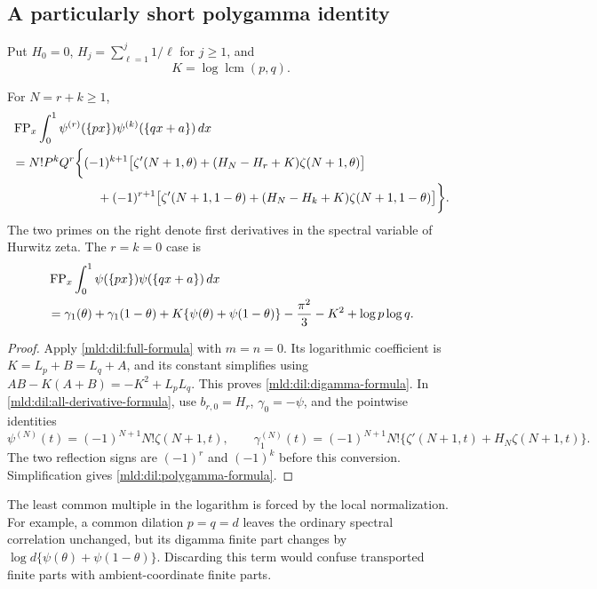 \subsection{A particularly short polygamma identity}
Put $H_0=0$, $H_j=\sum_{\ell=1}^j1/\ell$ for $j\ge1$, and
\[
 K=\log\operatorname{lcm}(p,q).
\]
\begin{corollary}
\label{mld:dil:polygamma}
For $N=r+k\ge1$,
\begin{align}
 &\operatorname{FP}_x\int_0^1
         \psi^{(r)}(\{px\})\psi^{(k)}(\{qx+a\})\,dx\notag\\
 &=N!P^kQ^r\biggl\{
 (-1)^{k+1}\bigl[\zeta'(N+1,\theta)
                 +(H_N-H_r+K)\zeta(N+1,\theta)\bigr]\notag\\
 &\hspace{24mm}+(-1)^{r+1}\bigl[\zeta'(N+1,1-\theta)
                 +(H_N-H_k+K)\zeta(N+1,1-\theta)\bigr]\biggr\}.
 \label{mld:dil:polygamma-formula}
\end{align}
The two primes on the right denote first derivatives in the spectral
variable of Hurwitz zeta.  The $r=k=0$ case is
\begin{align}
 &\operatorname{FP}_x\int_0^1\psi(\{px\})\psi(\{qx+a\})\,dx\notag\\
 &=\gamma_1(\theta)+\gamma_1(1-\theta)
       +K\{\psi(\theta)+\psi(1-\theta)\}
       -\frac{\pi^2}{3}-K^2+\log p\log q.
 \label{mld:dil:digamma-formula}
\end{align}
\end{corollary}
\begin{proof}
Apply \eqref{mld:dil:full-formula} with $m=n=0$.  Its logarithmic
coefficient is $K=L_p+B=L_q+A$, and its constant simplifies using
$AB-K(A+B)=-K^2+L_pL_q$.  This proves
\eqref{mld:dil:digamma-formula}.  In
\eqref{mld:dil:all-derivative-formula}, use $b_{r,0}=H_r$,
$\gamma_0=-\psi$, and the pointwise identities
\[
 \psi^{(N)}(t)=(-1)^{N+1}N!\zeta(N+1,t),\qquad
 \gamma_1^{(N)}(t)=(-1)^{N+1}N!
       \{\zeta'(N+1,t)+H_N\zeta(N+1,t)\}.
\]
The two reflection signs are $(-1)^r$ and $(-1)^k$ before this
conversion.  Simplification gives \eqref{mld:dil:polygamma-formula}.
\end{proof}

The least common multiple in the logarithm is forced by the local
normalization.  For example, a common dilation $p=q=d$ leaves the
ordinary spectral correlation unchanged, but its digamma finite part
changes by $\log d\{\psi(\theta)+\psi(1-\theta)\}$.
Discarding this term would confuse transported finite parts with
ambient-coordinate finite parts.

